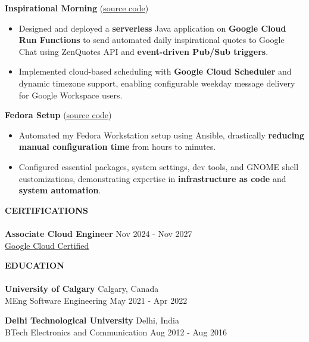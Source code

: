 \documentclass[a4paper]{article}
\newcommand{\lineunder} {
    \vspace*{0pt} \\
    {\color{Accent}\hspace*{-18pt} \hrulefill \hspace*{-6pt}} \\
}
\newcommand{\header} [1] {
    \vspace*{3pt}
    {\hspace*{-18pt} \textcolor{Accent}{\large\textbf{\MakeUppercase{#1}}}}
    \vspace*{-6pt} \lineunder
}
\newcommand{\resumeHeadingProject}[3]{
    {\textbf{#1}} (\href{#2}{\uline{source code}})
    \vspace{-2mm}
}
\newcommand{\resumeItemProject}[1]{
  \item{
    \begin{justify}
    \setlength{\rightskip}{0.15in} {#1 \vspace{-4pt}}
    \end{justify}
  }
}
\newcommand{\resumeHeadingEducation}[4]{
    \textbf{#1} \hfill {#2}\\
    {#3} \hfill {#4}\\
    \vspace{2mm}
}
\begin{document}
\resumeHeadingProject {Inspirational Morning} {https://github.com/zbhavyai/inspirational-morning} {Jun 2024 - Jun 2024}
\begin{itemize}
    \resumeItemProject {Designed and deployed a \textbf{serverless} Java application on \textbf{Google Cloud Run Functions} to send automated daily inspirational quotes to Google Chat using ZenQuotes API and \textbf{event-driven Pub/Sub triggers}.}
    \resumeItemProject {Implemented cloud-based scheduling with \textbf{Google Cloud Scheduler} and dynamic timezone support, enabling configurable weekday message delivery for Google Workspace users.}
\end{itemize}

\resumeHeadingProject {Fedora Setup} {https://github.com/zbhavyai/fedora-setup} {May 2025 - May 2025}
\begin{itemize}
    \resumeItemProject {Automated my Fedora Workstation setup using Ansible, drastically \textbf{reducing manual configuration time} from hours to minutes.}
    \resumeItemProject {Configured essential packages, system settings, dev tools, and GNOME shell customizations, demonstrating expertise in \textbf{infrastructure as code} and \textbf{system automation}.}
\end{itemize}
\vspace{5pt}

\header{Certifications}

\textbf{Associate Cloud Engineer} \hfill Nov 2024 - Nov 2027\\
\href{https://www.credly.com/badges/52bb681c-f535-47e7-b669-78e9b4d7c4a0}{\uline{Google Cloud Certified}}
\vspace{10pt}


\header{Education}

\resumeHeadingEducation {University of Calgary} {Calgary, Canada} {MEng Software Engineering} {May 2021 - Apr 2022}
\resumeHeadingEducation {Delhi Technological University} {Delhi, India} {BTech Electronics and Communication} {Aug 2012 - Aug 2016}


\end{document}
